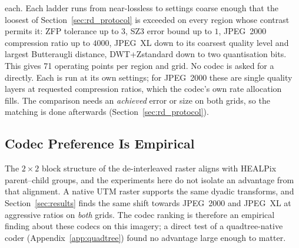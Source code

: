 each. Each ladder runs from near-lossless to settings coarse enough that
the loosest  of Section~\ref{sec:rd_protocol} is exceeded on every
region whose contrast permits it: ZFP tolerance up to $3$, SZ3 error
bound up to $1$, JPEG~2000 compression ratio up to $4000$, JPEG~XL down
to its coarsest quality level and largest Butteraugli distance,
DWT+Zstandard down to two quantisation bits. This gives 71 operating
points per region and grid. No codec is asked for a  directly. Each is run at its own
settings; for JPEG~2000 these are single quality layers at requested
compression ratios, which the codec's own rate
allocation~\cite{auli2008scalability} fills. The comparison needs an
\emph{achieved} error or size on both grids, so the matching is done
afterwards (Section~\ref{sec:rd_protocol}).

\subsection{Codec Preference Is Empirical}
\label{sec:why_quadtree}
The $2\times2$ block structure of the de-interleaved raster aligns with
HEALPix parent--child groups, and the experiments here do not isolate an
advantage from that alignment. A native UTM raster supports the same
dyadic transforms, and Section~\ref{sec:results} finds the same shift
towards JPEG~2000 and JPEG~XL at aggressive ratios on \emph{both} grids.
The codec ranking is therefore an empirical finding about these codecs on
this imagery; a direct test of a quadtree-native coder
(Appendix~\ref{app:quadtree}) found no advantage large enough to matter.

